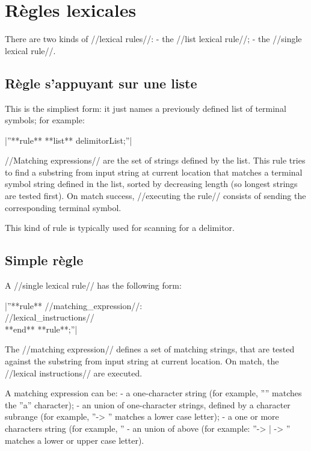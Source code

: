 \section{Règles lexicales}

There are two kinds of //lexical rules//:
  - the //list lexical rule//;
  - the //single lexical rule//.

\subsection{Règle s'appuyant sur une liste}

This is the simpliest form: it just names a previously defined list of terminal symbols; for example:

|''**rule** **list** delimitorList;''|

//Matching expressions// are the set of strings defined by the list. This rule tries to find a substring from input string at current location that matches a terminal symbol string defined in the list, sorted by decreasing length (so longest strings are tested first). On match success, //executing the rule// consists of sending the corresponding terminal symbol.

This kind of rule is typically used for scanning for a delimitor.

\subsection{Simple règle}

A //single lexical rule// has the following form:

|''**rule** //matching\_expression//:\\  //lexical\_instructions//\\ **end** **rule**;''|

The //matching expression// defines a set of matching strings, that are tested against the substring from input string at current location. On match, the //lexical instructions// are executed.

A matching expression can be:
  - a one-character string (for example, ''\textquotesingle'' matches the ''a'' character);
  - an union of one-character strings, defined by a character subrange (for example, ''\textquotesingle -> \textquotesingle'' matches a lower case letter);
  - a one or more characters string (for example, ''%
  - an union of above (for example: ''\textquotesingle -> \textquotesingle | \textquotesingle -> \textquotesingle'' matches a lower or upper case letter).

